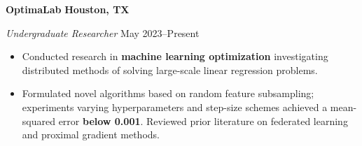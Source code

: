 \textbf{OptimaLab} \hfill \textbf{Houston, TX}\par
\textit{Undergraduate Researcher} \hfill May 2023--Present
\begin{itemize}
	\item Conducted research in \textbf{machine learning optimization} investigating distributed methods of solving large-scale linear regression problems.
	\item Formulated novel algorithms based on random feature subsampling; experiments varying hyperparameters and step-size schemes achieved a mean-squared error \textbf{below 0.001}. Reviewed prior literature on federated learning and proximal gradient methods.
\end{itemize}\par

